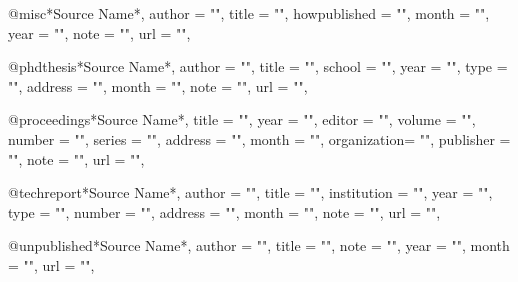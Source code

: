 @misc{*Source Name*,
    author          = "",   %
    title           = "",   %
    howpublished    = "",   %
    month           = "",   %
    year            = "",
    note            = "",   %
    url             = "",   %
}

@phdthesis{*Source Name*,
    author      = "",
    title       = "",
    school      = "",
    year        = "",
    type        = "",   %
    address     = "",   %
    month       = "",   %
    note        = "",   %
    url         = "",   %
}

@proceedings{*Source Name*,
    title       = "",
    year        = "",
    editor      = "",   %
    volume      = "",   %
    number      = "",   %
    series      = "",   %
    address     = "",   %
    month       = "",   %
    organization= "",   %
    publisher   = "",   %
    note        = "",   %
    url         = "",   %
}

@techreport{*Source Name*,
    author      = "",
    title       = "",
    institution = "",
    year        = "",
    type        = "",   %
    number      = "",   %
    address     = "",   %
    month       = "",   %
    note        = "",   %
    url         = "",   %
}

@unpublished{*Source Name*,
    author      = "",
    title       = "",
    note        = "",
    year        = "",    
    month       = "",   %
    url         = "",   %
}